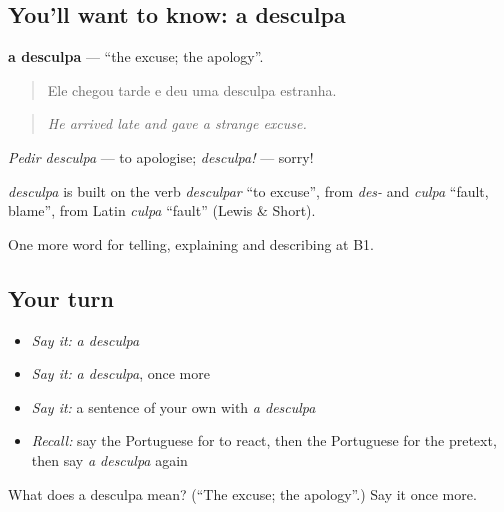 \subsection*{You'll want to know: a desculpa}
\textbf{a desculpa} — \textquotedblleft{}the excuse; the apology\textquotedblright{}.

\begin{quote}
Ele chegou tarde e deu uma desculpa estranha.
\end{quote}

\begin{quote}
\emph{He arrived late and gave a strange excuse.}
\end{quote}

\emph{Pedir desculpa} — to apologise; \emph{desculpa!} — sorry!

\begin{cousinweb}
\emph{desculpa} is built on the verb \emph{desculpar} \textquotedblleft{}to excuse\textquotedblright{}, from \emph{des-} and \emph{culpa} \textquotedblleft{}fault, blame\textquotedblright{}, from Latin \emph{culpa} \textquotedblleft{}fault\textquotedblright{} (Lewis \& Short).
\end{cousinweb}

\begin{grammarlens}[title={What you've built}]
One more word for telling, explaining and describing at B1.
\end{grammarlens}

\subsection*{Your turn}
\begin{itemize}
\raggedright
  \item \emph{Say it:} \emph{a desculpa}
  \item \emph{Say it:} \emph{a desculpa}, once more
  \item \emph{Say it:} a sentence of your own with \emph{a desculpa}
  \item \emph{Recall:} say the Portuguese for to react, then the Portuguese for the pretext, then say \emph{a desculpa} again
\end{itemize}

\begin{tcolorbox}[breakable,colback=teal!4,colframe=teal!35!black,title={Before you move on}]
What does a desculpa mean? (\textquotedblleft{}The excuse; the apology\textquotedblright{}.) Say it once more.
\end{tcolorbox}
